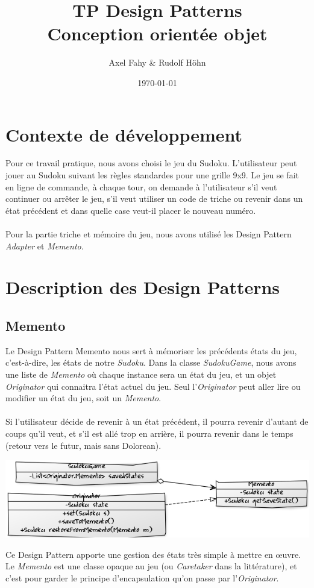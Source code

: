 \documentclass[a4paper]{article}
\title{TP Design Patterns\\Conception orientée objet}
\author{Axel Fahy \& Rudolf Höhn}
\date{\today}
\begin{document}
\maketitle

\section{Contexte de développement}
Pour ce travail pratique, nous avons choisi le jeu du Sudoku.
L'utilisateur peut jouer au Sudoku suivant les règles standardes pour une grille 9x9.
Le jeu se fait en ligne de commande, à chaque tour, on demande à l'utilisateur s'il veut continuer ou arrêter le jeu,
s'il veut utiliser un code de triche ou revenir dans un état précédent et dans quelle case veut-il placer le nouveau numéro.
\\\\
Pour la partie triche et mémoire du jeu, nous avons utilisé les Design Pattern \textit{Adapter} et \textit{Memento}.

\section{Description des Design Patterns}

\subsection{Memento}
Le Design Pattern Memento nous sert à mémoriser les précédents états du jeu, c'est-à-dire, les états de notre \textit{Sudoku}.
Dans la classe \textit{SudokuGame}, nous avons une liste de \textit{Memento} où chaque instance sera un état du jeu, et un objet \textit{Originator} qui connaitra l'état actuel du jeu.
Seul l'\textit{Originator} peut aller lire ou modifier un état du jeu, soit un \textit{Memento}.\\\\
Si l'utilisateur décide de revenir à un état précédent, il pourra revenir d'autant de coups qu'il veut, et s'il est allé trop en arrière, il pourra revenir dans le temps (retour vers le futur, mais sans Dolorean).
\begin{center}
\includegraphics[scale=0.7]{../diagrams/memento.png}
\end{center}
Ce Design Pattern apporte une gestion des états très simple à mettre en œuvre.
Le \textit{Memento} est une classe opaque au jeu (ou \textit{Caretaker} dans la littérature), et c'est pour garder le principe d'encapsulation qu'on passe par l'\textit{Originator}.
\end{document}
